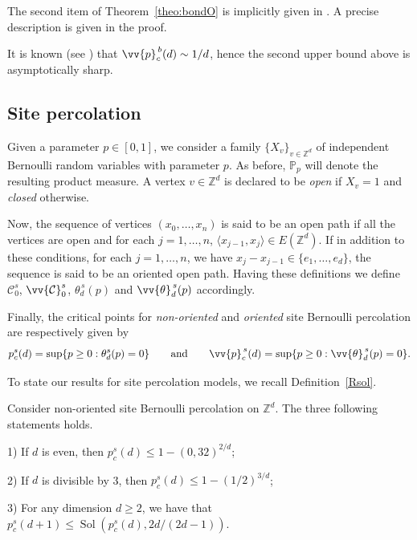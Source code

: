 \documentclass{aptpub}
\newcommand{\Z}{\mathbb{Z}}
\newcommand{\Pp}{\mathbb{P}}
\DeclareMathOperator{\Sol}{Sol}
\begin{document}
\begin{rem} The second item of Theorem~\ref{theo:bondO} is implicitly given in \cite{GPS}. A precise description is given in the proof.
\end{rem}

\begin{rem} It is known (see \cite{CD}) that $\vv{p}^{\,b}_c(d)\sim 1/d$, hence the second upper bound above is asymptotically sharp.
\end{rem}


\subsection{Site percolation}

Given a parameter $p \in [0,1]$, we consider a family $\{X_v\}_{v \in \Z^d}$ of independent Bernoulli random variables with parameter $p$. As before, $\Pp_p$ will denote the resulting product measure. A vertex $v \in \Z^d$ is declared to be {\it open} if  $X_v = 1$ and {\it closed} otherwise. 

Now, the sequence of vertices $(x_0, \dots, x_n)$ is said to be an open path if all the vertices are open and for each $j = 1, \dots, n$, $\langle x_{j-1}, x_j\rangle \in E(\Z^d)$. If in addition to these conditions, for each $j = 1, \dots, n$, we have $x_j - x_{j-1}\in \{e_1, \dots, e_d\}$, the sequence is said to be an oriented open path. Having these definitions we  define $\mathcal{C}^s_0$, $\vv{\mathcal{C}}^s_0$, $\theta_d^{\, s}(p)$ and $\vv{\theta}_d^{\, s}(p)$ accordingly.

Finally, the critical points for {\it non-oriented} and {\it oriented} site Bernoulli percolation are respectively given by
\[ p_c^{s}(d)=\sup\{p \geq 0 : \theta^s_d(p)=0\} \quad \quad \text{and} \quad \quad \vv{p}_c^{\, s}(d)=\sup\{p \geq 0 : \vv{\theta}^{\,s}_d(p)=0\} .\]


To state our results for site percolation models, we recall Definition~\ref{Rsol}. 


\begin{thm}\label{theo:siteNO}
Consider non-oriented site Bernoulli percolation on $\Z^d$. The three following statements holds.

1) If $d$ is even, then $ p_c^{s}(d)\leq 1-(0,32)^{2/d}$; 

2) If $d$ is divisible by 3, then $p_c^{s}(d)\leq 1-(1/2)^{3/d}$;

3) For any dimension $d\geq 2$, we have that $p_c^{s}(d+1)\leq \Sol(p^{s}_c(d),2d/(2d-1))$.



\end{thm}
\end{document}
